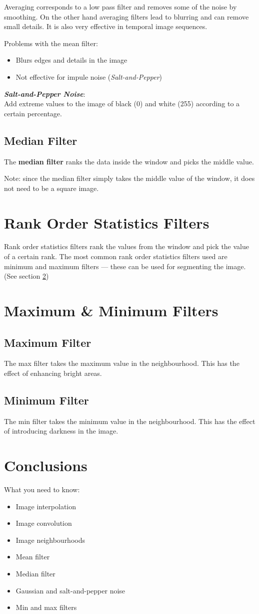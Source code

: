 \documentclass{article}
\begin{document}
Averaging corresponds to a low pass filter and removes some of the noise by smoothing.
On the other hand averaging filters lead to blurring and can remove small details.
It is also very effective in temporal image sequences.

Problems with the mean filter:
\begin{itemize}
	\item Blurs edges and details in the image
	\item Not effective for impule noise (\textit{Salt-and-Pepper})
\end{itemize}

\textbf{\textit{Salt-and-Pepper Noise}}:\\
Add extreme values to the image of black (0) and white (255) according to a certain percentage.

\subsection{Median Filter}
The \textbf{median filter} ranks the data inside the window and picks the middle value.

Note: since the median filter simply takes the middle value of the window, it does not need to be a square image.

\section{Rank Order Statistics Filters}
Rank order statistics filters rank the values from the window and pick the value of a certain rank.
The most common rank order statistics filters used are minimum and maximum filters --- these can be used for segmenting the image. 
(See section \ref{maxmin})

\section{Maximum \& Minimum Filters} \label{maxmin}
\subsection{Maximum Filter}
The max filter takes the maximum value in the neighbourhood.
This has the effect of enhancing bright areas.

\subsection{Minimum Filter}
The min filter takes the minimum value in the neighbourhood.
This has the effect of introducing darkness in the image.

\section{Conclusions}
What you need to know:
\begin{itemize}
	\item Image interpolation
	\item Image convolution
	\item Image neighbourhoods
	\item Mean filter
	\item Median filter
	\item Gaussian and salt-and-pepper noise
	\item Min and max filters
\end{itemize}
\end{document}
